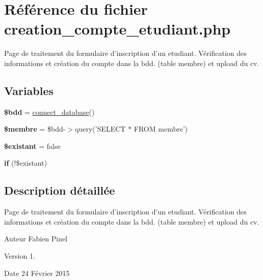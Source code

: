 \hypertarget{creation__compte__etudiant_8php}{\section{Référence du fichier creation\-\_\-compte\-\_\-etudiant.\-php}
\label{creation__compte__etudiant_8php}
}


Page de traitement du formulaire d'inscription d'un etudiant. Vérification des informations et création du compte dans la bdd. (table membre) et upload du cv.  


\subsection*{Variables}
\begin{DoxyCompactItemize}
\item 
\hypertarget{creation__compte__etudiant_8php_a94f91e878bce0991e2cd595c5dd79b3f}{{\bfseries \$bdd} = \hyperlink{function_8php_a1f56f7efe8c1222675d8715c259957d5}{connect\-\_\-database}()}\label{creation__compte__etudiant_8php_a94f91e878bce0991e2cd595c5dd79b3f}

\item 
\hypertarget{creation__compte__etudiant_8php_aa000a46a528298c316b1fdf788402a63}{{\bfseries \$membre} = \$bdd-\/$>$query('S\-E\-L\-E\-C\-T $\ast$ F\-R\-O\-M membre')}\label{creation__compte__etudiant_8php_aa000a46a528298c316b1fdf788402a63}

\item 
\hypertarget{creation__compte__etudiant_8php_a3289caad8efe0a8b4dffdfc5d252d16f}{{\bfseries \$existant} = false}\label{creation__compte__etudiant_8php_a3289caad8efe0a8b4dffdfc5d252d16f}

\item 
\hypertarget{creation__compte__etudiant_8php_ae323bae9e4555e3f7c972a5acd2cb3e9}{{\bfseries if} (!\$existant)}\label{creation__compte__etudiant_8php_ae323bae9e4555e3f7c972a5acd2cb3e9}

\end{DoxyCompactItemize}


\subsection{Description détaillée}
Page de traitement du formulaire d'inscription d'un etudiant. Vérification des informations et création du compte dans la bdd. (table membre) et upload du cv. \begin{DoxyAuthor}{Auteur}
Fabien Pinel 
\end{DoxyAuthor}
\begin{DoxyVersion}{Version}
1. 
\end{DoxyVersion}
\begin{DoxyDate}{Date}
24 Février 2015 
\end{DoxyDate}
